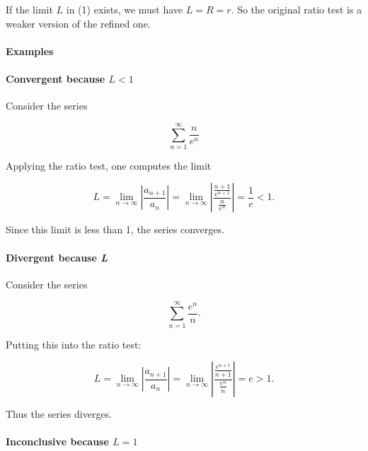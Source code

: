 If the limit $L$ in (1) exists, we must have $L = R = r$. So the original ratio test is a weaker version of the refined one.



\paragraph{Examples}



\paragraph{Convergent because $L < 1$}



Consider the series



$$\sum _{n=1}^\infty\frac{n}{e^n}$$



Applying the ratio test, one computes the limit



$$L = \lim _{n\to\infty} \left| \frac{a _{n+1}}{a _n} \right| = \lim _{n\to\infty} \left| \frac{\frac{n+1}{e^{n+1}}}{\frac{n}{e^n}}\right| = \frac{1}{e} < 1.$$



Since this limit is less than 1, the series converges.



\paragraph{Divergent because \textit{L} }



Consider the series



$$\sum _{n=1}^\infty\frac{e^n}{n}.$$



Putting this into the ratio test:



$$L = \lim _{n\to\infty} \left| \frac{a _{n+1}}{a _n} \right| = \lim _{n\to\infty} \left| \frac{\frac{e^{n+1}}{n+1}}{\frac{e^n}{n}} \right|

= e > 1.$$



Thus the series diverges.



\paragraph{Inconclusive because $L = 1$}



